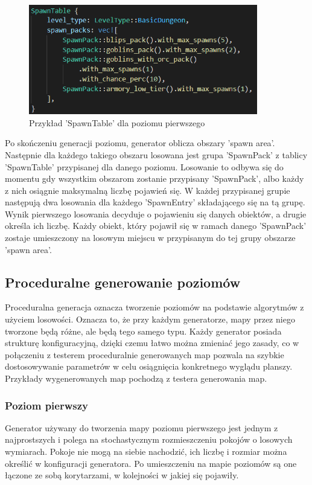 \documentclass[12pt,twoside]{article}
\begin{document}
\FloatBarrier
\begin{figure}[ht]
	\centering
	\includegraphics[width=10cm]{images/code/basic_spawn.png}
	\caption{Przykład 'SpawnTable' dla poziomu pierwszego}
	\label{code:basic_spawn}
\end{figure}
\FloatBarrier

Po skończeniu generacji poziomu, generator oblicza obszary 'spawn area'. Następnie dla każdego takiego obszaru losowana jest grupa 'SpawnPack' z tablicy 'SpawnTable' przypisanej dla danego poziomu. Losowanie to odbywa się do momentu gdy wszystkim obszarom zostanie przypisany 'SpawnPack', albo każdy z nich osiągnie maksymalną liczbę pojawień się. W każdej przypisanej grupie następują dwa losowania dla każdego 'SpawnEntry' składającego się na tą grupę. Wynik pierwszego losowania decyduje o pojawieniu się danych obiektów, a drugie określa ich liczbę. Każdy obiekt, który pojawił się w ramach danego 'SpawnPack' zostaje umieszczony na losowym miejscu w przypisanym do tej grupy obszarze 'spawn area'.


\subsection{Proceduralne generowanie poziomów}
Proceduralna generacja oznacza tworzenie poziomów na podstawie algorytmów z użyciem losowości. Oznacza to, że przy każdym generatorze, mapy przez niego tworzone będą różne, ale będą tego samego typu. Każdy generator posiada strukturę konfiguracyjną, dzięki czemu łatwo można zmieniać jego zasady, co w połączeniu z testerem proceduralnie generowanych map pozwala na szybkie dostosowywanie parametrów w celu osiągnięcia konkretnego wyglądu planszy. Przykłady wygenerowanych map pochodzą z testera generowania map.

\subsubsection{Poziom pierwszy}
Generator używany do tworzenia mapy poziomu pierwszego jest jednym z najprostszych i polega na stochastycznym rozmieszczeniu pokojów o losowych wymiarach. Pokoje nie mogą na siebie nachodzić, ich liczbę i rozmiar można określić w konfiguracji generatora. Po umieszczeniu na mapie poziomów są one łączone ze sobą korytarzami, w kolejności w jakiej się pojawiły.
\end{document}
